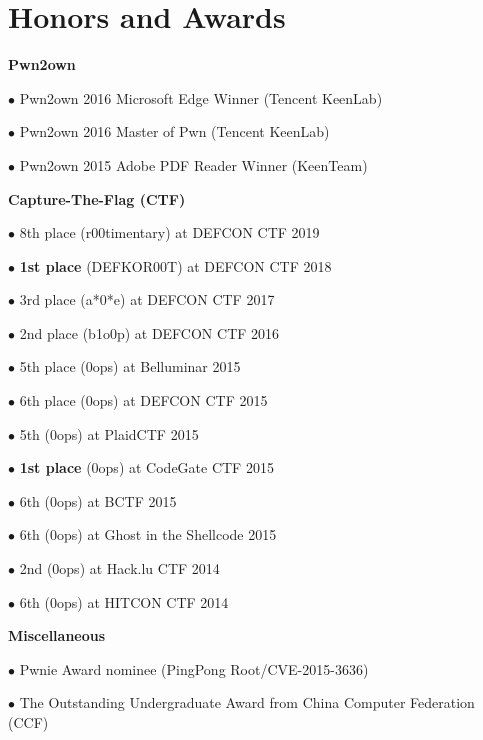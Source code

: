 \section*{Honors and Awards}
\begin{description}
\item{\bf {Pwn2own}}
	\item $\bullet$ Pwn2own 2016 Microsoft Edge Winner (Tencent KeenLab) 
	\item $\bullet$ Pwn2own 2016 Master of Pwn (Tencent KeenLab) 
	\item $\bullet$ Pwn2own 2015 Adobe PDF Reader Winner (KeenTeam) 
\item{\bf {Capture-The-Flag (CTF)}}
    \item 
	\item $\bullet$ 8th place (r00timentary) at DEFCON CTF 2019 
	\item $\bullet$ \textbf{1st place} (DEFKOR00T) at DEFCON CTF 2018 
	\item $\bullet$ 3rd place (a*0*e) at DEFCON CTF 2017 
	\item $\bullet$ 2nd place (b1o0p) at DEFCON CTF 2016 
	\item $\bullet$ 5th place (0ops) at Belluminar 2015 
	\item $\bullet$ 6th place (0ops) at DEFCON CTF 2015 
	\item $\bullet$ 5th (0ops) at PlaidCTF 2015 
	\item $\bullet$ \textbf{1st place} (0ops) at CodeGate CTF 2015 
	\item $\bullet$ 6th (0ops) at BCTF 2015 
	\item $\bullet$ 6th (0ops) at Ghost in the Shellcode 2015 
	\item $\bullet$ 2nd (0ops) at Hack.lu CTF 2014 
	\item $\bullet$ 6th (0ops) at HITCON CTF 2014 
\item{\bf {Miscellaneous}}
	\item $\bullet$ Pwnie Award nominee (PingPong Root/CVE-2015-3636) 
	\item $\bullet$ The Outstanding Undergraduate Award from China Computer Federation (CCF) 
\end{description}
